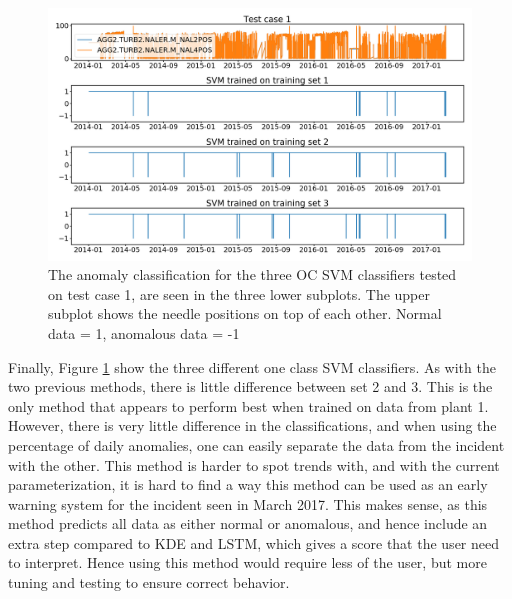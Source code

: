         \begin{figure}[h!]
            \centering
            \includegraphics[width=\textwidth]{report/figures/analysis/training_cases/svm_training_cases.png}
            \caption{The anomaly classification for the three OC SVM classifiers tested on test case 1, are seen in the three lower subplots. The upper subplot shows the needle positions on top of each other. Normal data = 1, anomalous data = -1}
            \label{fig:svm_training_cases}
        \end{figure}
        Finally, Figure \ref{fig:svm_training_cases} show the three different one class SVM classifiers. As with the two previous methods, there is little difference between set 2 and 3. This is the only method that appears to perform best when trained on data from plant 1. However, there is very little difference in the classifications, and when using the percentage of daily anomalies, one can easily separate the data from the incident with the other. This method is harder to spot trends with, and with the current parameterization, it is hard to find a way this method can be used as an early warning system for the incident seen in March 2017. This makes sense, as this method predicts all data as either normal or anomalous, and hence include an extra step compared to KDE and LSTM, which gives a score that the user need to interpret. Hence using this method would require less of the user, but more tuning and testing to ensure correct behavior. 
        
    
